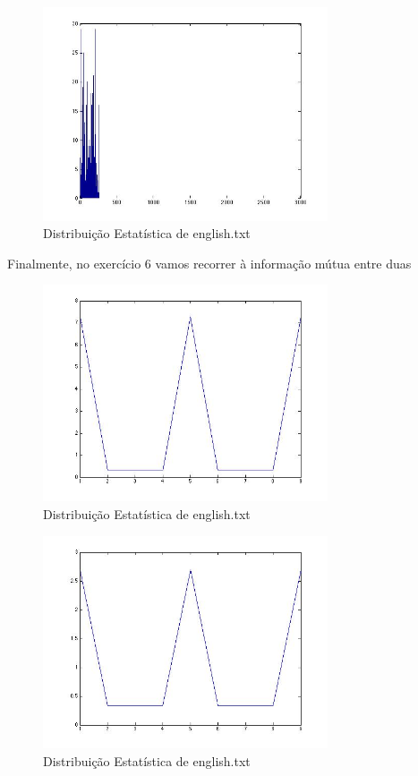 \documentclass[12pt]{article}
\begin{document}
  \begin{figure}[H]
    \centering
      \includegraphics[width=0.75\textwidth]{ex5english}
    \caption{Distribuição Estatística de english.txt}
  \end{figure}

  Finalmente, no exercício 6 vamos recorrer à informação mútua entre duas

   \begin{figure}[H]
    \centering
      \includegraphics[width=0.75\textwidth]{ex6a}
    \caption{Distribuição Estatística de english.txt}
  \end{figure}

   \begin{figure}[H]
    \centering
      \includegraphics[width=0.75\textwidth]{ex6b}
    \caption{Distribuição Estatística de english.txt}
  \end{figure}
  
\end{document}
